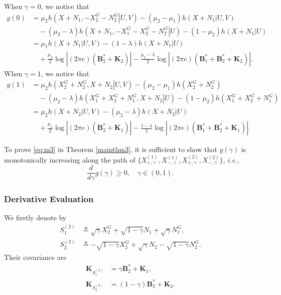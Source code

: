 \documentclass[journal,final, onecolumn]{IEEEtran}
\begin{document}
When $\gamma=0$, we notice that
\begin{align}
g(0)& = \mu_2 h\left(\left.X+N_{1}, -X^{G}_{2} - N^{G}_{2} \right| U,V \right)- (\mu_2-\mu_1) h\left( X+N_1|U,V \right) \nonumber \\
&\quad - (\mu_2-\lambda) h \left( \left.X+N_{1}, -X^{G}_{1}-X^{G}_{2} - N^{G}_{2}\right|U \right) - (1-\mu_2)h \left( X+N_{1} |U    \right)\\
&=\mu_{1}h(X+N_{1}|U,V)-(1-\lambda)h(X+N_1|U) \nonumber \\
& \quad + \frac{\mu_{2}}{2} \log \left| (2\pi e) (\boldsymbol{B}_{2}^{*} + \boldsymbol{K}_{2}) \right|-\frac{\mu_{2} - \lambda}{2} \log \left| (2\pi e) (\boldsymbol{B}_{1}^{*}+\boldsymbol{B}_{2}^{*} + \boldsymbol{K}_{2}) \right|.
\end{align}
When $\gamma=1$, we notice that
\begin{align}
g(1) &=\mu_2 h \left( \left. X^{G}_{2}+N^{G}_{2},X+N_{2} \right| U,V      \right) - (\mu_2-\mu_1) h\left(X^{G}_{2}+N^{G}_{2}\right)\nonumber \\
      &\quad -(\mu_2-\lambda) h \left(\left.   X^{G}_{1}+X^{G}_{2}+N^{G}_{1},       X+N_{2}        \right|U  \right) - (1-\mu_2)h \left(  X^{G}_{1}+X^{G}_{2}+N^{G}_{1}       \right) \\
      &= \mu_{2} h(X+N_{2}|U,V) - (\mu_2-\lambda) h(X+N_{2}|U) \nonumber \\
      &\quad + \frac{\mu_{1}}{2} \log \left| (2\pi e) (\boldsymbol{B}_{2}^{*} + \boldsymbol{K}_{1}) \right|- \frac{1 - \lambda}{2} \log \left| (2\pi e) (\boldsymbol{B}_{1}^{*}+\boldsymbol{B}_{2}^{*} + \boldsymbol{K}_{1}) \right|.
\end{align}

To prove \eqref{eq:m3} in Theorem \ref{mainthm3}, it is sufficient to show that $g(\gamma)$ is monotonically increasing along the path of $\{X^{(1)}_{+,\gamma}, X^{(1)}_{-,\gamma}, X^{(2)}_{+,\gamma}, X^{(2)}_{-,\gamma}\}$, \emph{i.e.},
\begin{equation}
\frac{d}{d\gamma} g(\gamma) \geq 0,   \quad \gamma \in (0,1).
\end{equation}

\subsubsection{Derivative Evaluation}
We firstly denote by
\begin{align}
S^{(2)}_{1} &\triangleq \sqrt{\gamma}X_{2}^{G}+\sqrt{1-\gamma}N_{1} + \sqrt{\gamma} N^{G}_{1}, \label{eq:S1_2}\\
S^{(2)}_{2} &\triangleq -\sqrt{1-\gamma}X_{2}^{G}+ \sqrt{\gamma}N_{2}- \sqrt{1-\gamma}N^{G}_{2}. \label{eq:S2_2}
\end{align}
Their covariance are
\begin{align}
\boldsymbol{K}_{S^{(2)}_1} &= \gamma \boldsymbol{B}^{*}_{2} + \boldsymbol{K}_{1},\\
\boldsymbol{K}_{S^{(2)}_2} &= (1-\gamma) \boldsymbol{B}^{*}_{2} + \boldsymbol{K}_{2}.
\end{align}
\end{document}
